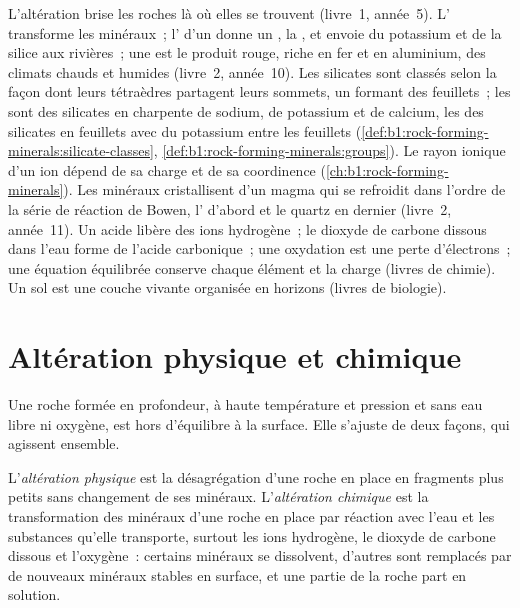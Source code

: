 \begin{recall}
L'altération brise les roches là où elles se trouvent (livre~1, année~5). L' transforme les minéraux~; l' d'un  donne un , la , et envoie du potassium et de la silice aux rivières~; une  est
le produit rouge, riche en fer et en aluminium, des climats chauds et humides (livre~2,
année~10). Les silicates sont classés selon la façon dont leurs tétraèdres  partagent
leurs sommets, un  formant des feuillets~; les  sont des silicates en charpente de
sodium, de potassium et de calcium, les  des silicates en feuillets avec du potassium entre les
feuillets (\cref{def:b1:rock-forming-minerals:silicate-classes},
\cref{def:b1:rock-forming-minerals:groups}). Le rayon ionique d'un ion dépend de
sa charge et de sa coordinence (\cref{ch:b1:rock-forming-minerals}). Les minéraux
cristallisent d'un magma qui se refroidit dans l'ordre de la série de réaction de Bowen,
l' d'abord et le quartz en dernier (livre~2, année~11). Un acide libère des
ions hydrogène~; le dioxyde de carbone dissous dans l'eau forme de l'acide carbonique~; une oxydation est une
perte d'électrons~; une équation équilibrée conserve chaque élément et la charge
(livres de chimie). Un sol est une couche vivante organisée en horizons (livres de
biologie).
\end{recall}

\section{Altération physique et chimique}\label{sec:b1:weathering-clays:types}

Une roche formée en profondeur, à haute température et pression et sans eau libre
ni oxygène, est hors d'équilibre à la surface. Elle s'ajuste de deux façons, qui
agissent ensemble.

\begin{definition}\label{def:b1:weathering-clays:weathering}
L'\emph{altération physique} est la désagrégation d'une
roche en place en fragments plus petits sans changement de ses minéraux.
L'\emph{altération chimique} est la transformation des
minéraux d'une roche en place par réaction avec l'eau et les substances qu'elle
transporte, surtout les ions hydrogène, le dioxyde de carbone dissous et l'oxygène~: certains
minéraux se dissolvent, d'autres sont remplacés par de nouveaux minéraux stables en surface,
et une partie de la roche part en solution.
\end{definition}

